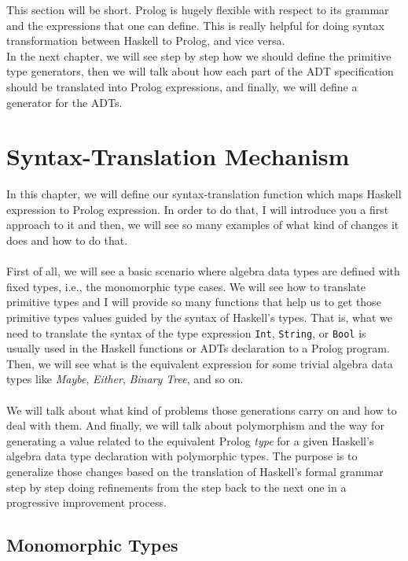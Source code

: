 \documentclass{report}
\theoremstyle{definition}
\theoremstyle{definition}
\newcommand{\ttt}[1]{\texttt{#1}}
\begin{document}
This section will be short. Prolog is hugely flexible with respect to its grammar and the expressions that one can define. This is really helpful for doing syntax transformation between Haskell to Prolog, and vice versa.\\

In the next chapter, we will see step by step how we should define the primitive type generators, then we will talk about how each part of the ADT specification should be translated into Prolog expressions, and finally, we will define a generator for the ADTs.

\chapter{Syntax-Translation Mechanism}

In this chapter, we will define our syntax-translation function which maps Haskell expression to Prolog expression. In order to do that, I will introduce you a first approach to it and then, we will see so many examples of what kind of changes it does and how to do that.\\\\
First of all, we will see a basic scenario where algebra data types are defined with fixed types, i.e., the monomorphic type cases. We will see how to translate primitive types and I will provide so many functions that help us to get those primitive types values guided by the syntax of Haskell's types. That is, what we need to translate the syntax of the type expression \ttt{Int}, \ttt{String}, or \ttt{Bool} is usually used in the Haskell functions or ADTs declaration to a Prolog program. Then, we will see what is the equivalent expression for some trivial algebra data types like \textit{Maybe}, \textit{Either}, \textit{Binary Tree}, and so on.\\\\
We will talk about what kind of problems those generations carry on and how to deal with them. And finally, we will talk about polymorphism and the way for generating a value related to the equivalent Prolog \textit{type} for a given Haskell's algebra data type declaration with polymorphic types. The purpose is to generalize those changes based on the translation of Haskell's formal grammar step by step doing refinements from the step back to the next one in a progressive improvement process.

\section{Monomorphic Types} \label{ch:monomorphic-types}
\end{document}

